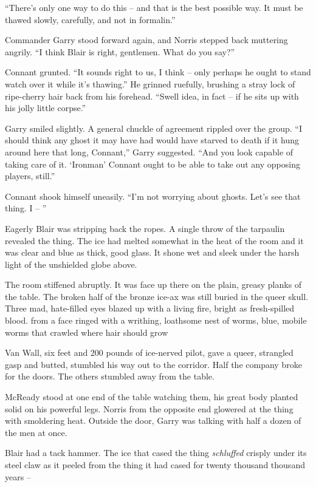 \documentclass[ebook,oneside,11pt]{memoir}				%
\begin{document}
``There's only one way to do this -- and that is the best possible way. It must be thawed slowly, carefully, and not in formalin.''

Commander Garry stood forward again, and Norris stepped back muttering angrily. ``I think Blair is right, gentlemen. What do you say?''

Connant grunted. ``It sounds right to us, I think -- only perhaps he ought to stand watch over it while it's thawing.'' He grinned ruefully, brushing a stray lock of ripe-cherry hair back from his forehead. ``Swell idea, in fact -- if he sits up with his jolly little corpse.''

Garry smiled slightly. A general chuckle of agreement rippled over the group. ``I should think any ghost it may have had would have starved to death if it hung around here that long, Connant,'' Garry suggested. ``And you look capable of taking care of it. `Ironman' Connant ought to be able to take out any opposing players, still.''

Connant shook himself uneasily. ``I'm not worrying about ghosts. Let's see that thing. I -- ''

Eagerly Blair was stripping back the ropes. A single throw of the tarpaulin revealed the thing. The ice had melted somewhat in the heat of the room and it was clear and blue as thick, good glass. It shone wet and sleek under the harsh light of the unshielded globe above.

The room stiffened abruptly. It was face up there on the plain, greasy planks of the table. The broken half of the bronze ice-ax was still buried in the queer skull. Three mad, hate-filled eyes blazed up with a living fire, bright as fresh-spilled blood. from a face ringed with a writhing, loathsome nest of worms, blue, mobile worms that crawled where hair should grow

Van Wall, six feet and 200 pounds of ice-nerved pilot, gave a queer, strangled gasp and butted, stumbled his way out to the corridor. Half the company broke for the doors. The others stumbled away from the table.

McReady stood at one end of the table watching them, his great body planted solid on his powerful legs. Norris from the opposite end glowered at the thing with smoldering heat. Outside the door, Garry was talking with half a dozen of the men at once.

Blair had a tack hammer. The ice that cased the thing \emph{schluffed} crisply under its steel claw as it peeled from the thing it had cased for twenty thousand thousand years --
\end{document}
